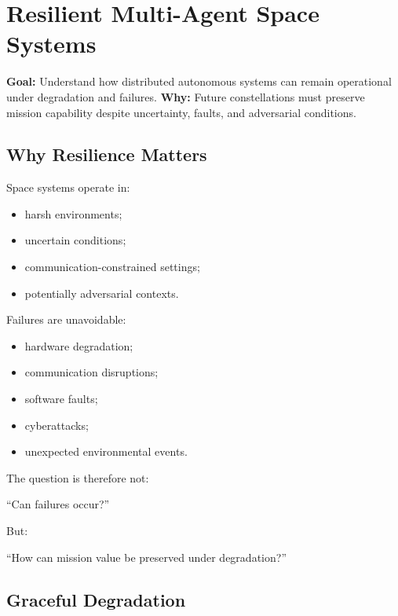 \documentclass[10pt,a4paper,twocolumn]{article}
\newcommand{\lesson}[3]{
\section{#1}
\noindent
\textbf{Goal:} #2 \newline
\textbf{Why:} #3
\vspace{0.1em}
}
\begin{document}


\lesson
{Resilient Multi-Agent Space Systems}
{Understand how distributed autonomous systems can remain operational under degradation and failures.}
{Future constellations must preserve mission capability despite uncertainty, faults, and adversarial conditions.}


\subsection{Why Resilience Matters}

Space systems operate in:
\begin{itemize}
    \item harsh environments;
    \item uncertain conditions;
    \item communication-constrained settings;
    \item potentially adversarial contexts.
\end{itemize}

Failures are unavoidable:
\begin{itemize}
    \item hardware degradation;
    \item communication disruptions;
    \item software faults;
    \item cyberattacks;
    \item unexpected environmental events.
\end{itemize}

The question is therefore not:
\begin{center}
    ``Can failures occur?''
\end{center}

But:
\begin{center}
    ``How can mission value be preserved under degradation?''
\end{center}


\subsection{Graceful Degradation}
\end{document}
